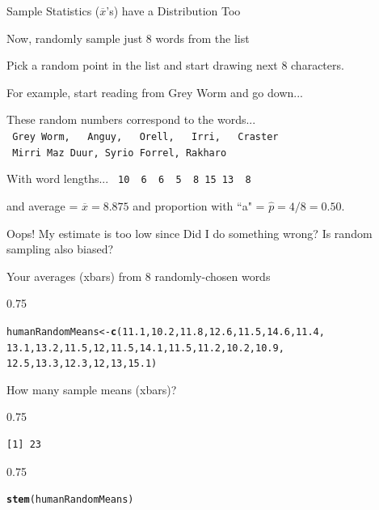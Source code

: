 \documentclass{beamer}\usepackage[]{graphicx}\usepackage[]{color}
\makeatletter
\newcommand{\hlnum}[1]{\textcolor[rgb]{0.2,0.2,0.2}{#1}}%
\newcommand{\hlstd}[1]{\textcolor[rgb]{0.102,0.102,0.102}{#1}}%
\newcommand{\hlkwb}[1]{\textcolor[rgb]{0.102,0.102,0.102}{#1}}%
\newcommand{\hlkwd}[1]{\textcolor[rgb]{0.102,0.102,0.102}{\textbf{#1}}}%
\newenvironment{kframe}{%
 \def\at@end@of@kframe{}%
 \ifinner\ifhmode%
  \def\at@end@of@kframe{\end{minipage}}%
  \begin{minipage}{\columnwidth}%
 \fi\fi%
 \def\FrameCommand##1{\hskip\@totalleftmargin \hskip-\fboxsep
 \colorbox{shadecolor}{##1}\hskip-\fboxsep
     \hskip-\linewidth \hskip-\@totalleftmargin \hskip\columnwidth}%
 \MakeFramed {\advance\hsize-\width
   \@totalleftmargin\z@ \linewidth\hsize
   \@setminipage}}%
 {\par\unskip\endMakeFramed%
 \at@end@of@kframe}
\newenvironment{knitrout}{}{} %
\renewenvironment{knitrout}{\begin{spacing}{0.75}\begin{tiny}}{\end{tiny}\end{spacing}}
\newcommand{\xbar}{\overline{x}}
\newcommand{\phat}{\widehat{p}}
\makeatother
\begin{document}
\begin{frame}{Sample Statistics ($\xbar$'s) have a Distribution Too\;\;}
\newpage

Now, randomly sample just 8 words from the list
\vskip0.25cm

Pick a random point in the list and start drawing next 8 characters.
\vskip0.25cm

For example, start reading from Grey Worm and go down...\\
\vskip0.25cm

These random numbers correspond to the words...\\
\verb| Grey Worm,   Anguy,   Orell,   Irri,   Craster |\\
\verb| Mirri Maz Duur, Syrio Forrel, Rakharo |
\vskip0.25cm

With word lengths...
\verb| 10  6  6  5  8 15 13  8 |
\vskip0.25cm

and average = $\xbar=8.875$\;\; and proportion with ``a" = $\phat=4/8=0.50$.
\vskip0.25cm

Oops!  My estimate is too low since 
Did I do something wrong?  Is random sampling also biased? 


Your averages (xbars) from 8 randomly-chosen words 
\begin{knitrout}\small
{}\color{fgcolor}\begin{kframe}
\begin{alltt}
\hlstd{humanRandomMeans} \hlkwb{<-} \hlkwd{c}\hlstd{(}\hlnum{11.1}\hlstd{,} \hlnum{10.2}\hlstd{,} \hlnum{11.8}\hlstd{,} \hlnum{12.6}\hlstd{,} \hlnum{11.5}\hlstd{,} \hlnum{14.6}\hlstd{,} \hlnum{11.4}\hlstd{,}
    \hlnum{13.1}\hlstd{,} \hlnum{13.2}\hlstd{,} \hlnum{11.5}\hlstd{,} \hlnum{12}\hlstd{,} \hlnum{11.5}\hlstd{,} \hlnum{14.1}\hlstd{,} \hlnum{11.5}\hlstd{,} \hlnum{11.2}\hlstd{,} \hlnum{10.2}\hlstd{,} \hlnum{10.9}\hlstd{,}
    \hlnum{12.5}\hlstd{,} \hlnum{13.3}\hlstd{,} \hlnum{12.3}\hlstd{,} \hlnum{12}\hlstd{,} \hlnum{13}\hlstd{,} \hlnum{15.1}\hlstd{)}
\end{alltt}
\end{kframe}
\end{knitrout}
How many sample means (xbars)?
\begin{knitrout}\small
{}\color{fgcolor}\begin{kframe}
\begin{verbatim}
[1] 23
\end{verbatim}
\end{kframe}
\end{knitrout}
\begin{knitrout}\small
{}\color{fgcolor}\begin{kframe}
\begin{alltt}
\hlkwd{stem}\hlstd{(humanRandomMeans)}
\end{alltt}
\begin{verbatim}


\end{verbatim}
\end{kframe}
\end{knitrout}
\end{frame}
\end{document}
